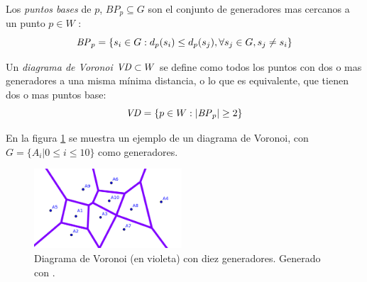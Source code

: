 Los \emph{puntos bases} de $p$, $BP_p \subseteq G$ son el conjunto de generadores mas cercanos a un punto $p \in W$ :
\begin{equation}
  \mathit{BP}_p =\{s_i \in G : d_p(s_i) \leq d_p(s_j), \forall s_j\in G,s_j \neq s_i\}\label{eq:bases}
\end{equation}

Un \emph{diagrama de Voronoi} $\mathit{VD}\subset W$ se define como todos los puntos con dos o mas generadores a una misma mínima distancia, o lo que es equivalente, que tienen dos o mas puntos base: 
\begin{equation}
  \mathit{VD} = \{p \in W : |\mathit{BP}_p| \geq 2\}\label{eq:DV}
\end{equation}


En la figura \ref{fig:ejemploVoronoi} se muestra un ejemplo de un diagrama de Voronoi, con $G=\{A_i | 0\leq i \leq 10\}$ como generadores.
\begin{figure}[H]
  \center
  \includegraphics[width=5.5cm]{imagenes/VD.png}
  \caption{Diagrama de Voronoi (en violeta) con diez generadores. Generado con \cite{voronoigeo}.}\label{fig:ejemploVoronoi}
\end{figure} 

